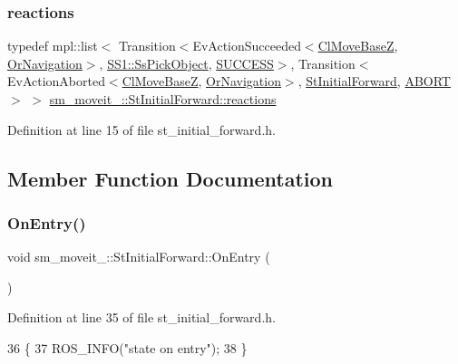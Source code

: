\subsubsection{\texorpdfstring{reactions}{reactions}}
{\footnotesize\ttfamily typedef mpl\+::list$<$ Transition$<$Ev\+Action\+Succeeded$<$\hyperlink{classcl__move__base__z_1_1ClMoveBaseZ}{Cl\+Move\+BaseZ}, \hyperlink{classsm__moveit__4_1_1OrNavigation}{Or\+Navigation}$>$, \hyperlink{structsm__moveit__4_1_1SS1_1_1SsPickObject}{S\+S1\+::\+Ss\+Pick\+Object}, \hyperlink{classSUCCESS}{S\+U\+C\+C\+E\+SS}$>$, Transition$<$Ev\+Action\+Aborted$<$\hyperlink{classcl__move__base__z_1_1ClMoveBaseZ}{Cl\+Move\+BaseZ}, \hyperlink{classsm__moveit__4_1_1OrNavigation}{Or\+Navigation}$>$, \hyperlink{structsm__moveit__4_1_1StInitialForward}{St\+Initial\+Forward}, \hyperlink{classABORT}{A\+B\+O\+RT}$>$ $>$ \hyperlink{structsm__moveit__4_1_1StInitialForward_aa32a1bc8fc4cfa1471cf98e94aa678a6}{sm\+\_\+moveit\+\_\+::\+St\+Initial\+Forward\+::reactions}}



Definition at line 15 of file st\+\_\+initial\+\_\+forward.\+h.



\subsection{Member Function Documentation}
\mbox{\label{structsm__moveit__4_1_1StInitialForward_a0cbc54b897439a6becd53ad1c2d8c4a0}} 
\subsubsection{\texorpdfstring{On\+Entry()}{OnEntry()}}
{\footnotesize\ttfamily void sm\+\_\+moveit\+\_\+::\+St\+Initial\+Forward\+::\+On\+Entry (\begin{DoxyParamCaption}{ }\end{DoxyParamCaption})\hspace{0.3cm}{\ttfamily [inline]}}



Definition at line 35 of file st\+\_\+initial\+\_\+forward.\+h.


\begin{DoxyCode}
36         \{
37             ROS\_INFO(\textcolor{stringliteral}{"state on entry"});
38         \}
\end{DoxyCode}
\mbox{\label{structsm__moveit__4_1_1StInitialForward_a4544db81cd390202f6321ad526a8a032}} 
